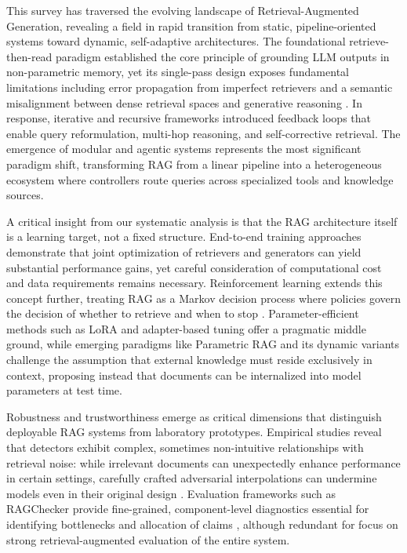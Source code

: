 \documentclass[11pt,a4paper]{article}
\begin{document}
This survey has traversed the evolving landscape of Retrieval-Augmented Generation, revealing a field in rapid transition from static, pipeline-oriented systems toward dynamic, self-adaptive architectures. The foundational retrieve-then-read paradigm \cite{arxiv:2005.11401v4} established the core principle of grounding LLM outputs in non-parametric memory, yet its single-pass design exposes fundamental limitations including error propagation from imperfect retrievers and a semantic misalignment between dense retrieval spaces and generative reasoning \cite{arxiv:2506.00054v1}. In response, iterative and recursive frameworks \cite{arxiv:2305.15294v2,arxiv:2403.06840v1} introduced feedback loops that enable query reformulation, multi-hop reasoning, and self-corrective retrieval. The emergence of modular and agentic systems \cite{arxiv:2401.15884v2,arxiv:2412.15529v4} represents the most significant paradigm shift, transforming RAG from a linear pipeline into a heterogeneous ecosystem where controllers route queries across specialized tools and knowledge sources.

A critical insight from our systematic analysis is that the RAG architecture itself is a learning target, not a fixed structure. End-to-end training approaches \cite{arxiv:2505.03075v1,arxiv:2510.01600v2} demonstrate that joint optimization of retrievers and generators can yield substantial performance gains, yet careful consideration of computational cost and data requirements remains necessary. Reinforcement learning extends this concept further, treating RAG as a Markov decision process where policies govern the decision of whether to retrieve and when to stop \cite{arxiv:2410.01782v1}. Parameter-efficient methods such as LoRA and adapter-based tuning \cite{arxiv:2501.11929v1} offer a pragmatic middle ground, while emerging paradigms like Parametric RAG and its dynamic variants \cite{arxiv:2501.15915v1,arxiv:2501.15915v1} challenge the assumption that external knowledge must reside exclusively in context, proposing instead that documents can be internalized into model parameters at test time.

Robustness and trustworthiness emerge as critical dimensions that distinguish deployable RAG systems from laboratory prototypes. Empirical studies \cite{arxiv:2401.17043v2,arxiv:2312.10997v5} reveal that detectors exhibit complex, sometimes non-intuitive relationships with retrieval noise: while irrelevant documents can unexpectedly enhance performance in certain settings, carefully crafted adversarial interpolations can undermine models even in their original design \cite{arxiv:2309.01431v2,arxiv:2401.15884v2}. Evaluation frameworks such as RAGChecker \cite{arxiv:2408.08067v2} provide fine-grained, component-level diagnostics essential for identifying bottlenecks and allocation of claims \cite{arxiv:2309.15217v1}, although redundant for focus on strong retrieval-augmented evaluation of the entire system.
\end{document}
